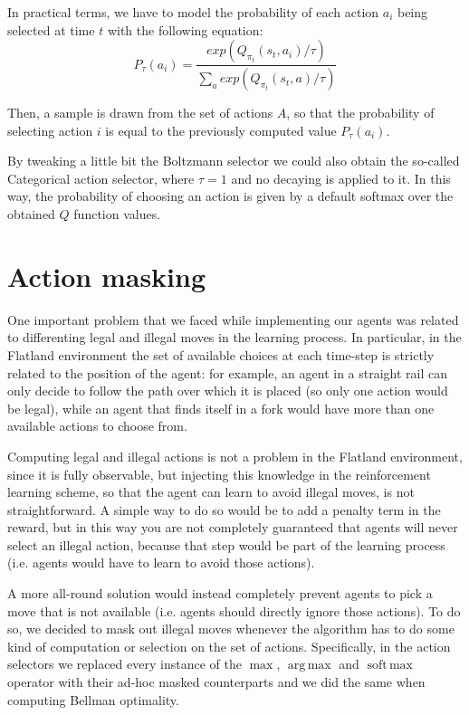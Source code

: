 \documentclass[a4paper,10pt]{report}
\DeclareMathOperator*{\argmax}{arg\,max}
\DeclareMathOperator*{\softmax}{soft\,max}
\begin{document}
In practical terms, we have to model the probability of each action $a_i$ being selected at time $t$ with the following equation:
$$
P_\tau(a_i) = \frac{exp(Q_{\pi_t}(s_t,a_i) / \tau)}{\sum_{a}exp(Q_{\pi_t}(s_t,a) / \tau)}
$$

Then, a sample is drawn from the set of actions $A$, so that the probability of selecting action $i$ is equal to the previously computed value $P_\tau(a_i)$.

By tweaking a little bit the Boltzmann selector we could also obtain the so-called Categorical action selector, where $\tau=1$ and no decaying is applied to it. In this way, the probability of choosing an action is given by a default softmax over the obtained $Q$ function values.

\section{Action masking}
One important problem that we faced while implementing our agents was related to differenting legal and illegal moves in the learning process. In particular, in the Flatland environment the set of available choices at each time-step is strictly related to the position of the agent: for example, an agent in a straight rail can only decide to follow the path over which it is placed (so only one action would be legal), while an agent that finds itself in a fork would have more than one available actions to choose from.

Computing legal and illegal actions is not a problem in the Flatland environment, since it is fully observable, but injecting this knowledge in the reinforcement learning scheme, so that the agent can learn to avoid illegal moves, is not straightforward. A simple way to do so would be to add a penalty term in the reward, but in this way you are not completely guaranteed that agents will never select an illegal action, because that step would be part of the learning process (i.e. agents would have to learn to avoid those actions).

A more all-round solution would instead completely prevent agents to pick a move that is not available (i.e. agents should directly ignore those actions). To do so, we decided to mask out illegal moves whenever the algorithm has to do some kind of computation or selection on the set of actions. Specifically, in the action selectors we replaced every instance of the $\max$, $\argmax$ and $\softmax$ operator with their ad-hoc masked counterparts and we did the same when computing Bellman optimality.
\end{document}
